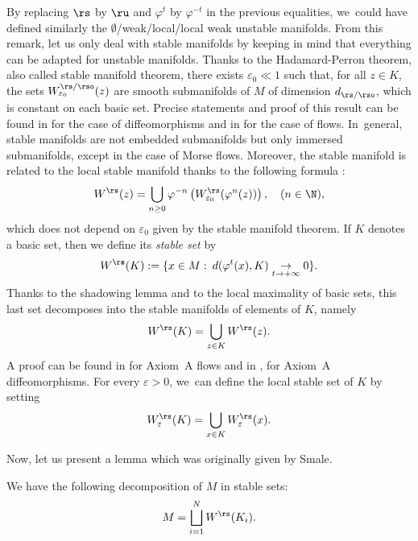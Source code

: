 By replacing $\rs$ by $\ru$ and $\varphi^t$ by $\varphi^{-t}$ in the previous equalities, we~could have defined similarly the $\emptyset$/weak/local/local weak unstable manifolds. From this remark, let us only deal with stable manifolds by keeping in mind that everything can be adapted for unstable manifolds. Thanks to the Hadamard-Perron theorem, also called stable manifold theorem, there exists $\varepsilon_0 \ll 1$ such that, for all $z \in K$, the sets $W_{\varepsilon_0}^{\rs/\rso} (z)$ are smooth submanifolds of $M$ of dimension $d_{\rs/\rso}$, which is constant on each basic set. Precise statements and proof of this result can be found in \cite[Th.\,6.4.9, p.\,267]{katok-hasselblatt} for the case of diffeomorphisms and in \cite[Th.\,5, p.\,34]{dyatlov} for the case of flows. In~general, stable manifolds are not embedded submanifolds but only immersed submanifolds, except in the case of Morse flows. Moreover, the stable manifold is related to the local stable manifold thanks to the following formula \cite[p.\,24]{dyatlov}:
\[
W^\rs (z) = \bigcup_{n \geq 0} \varphi^{-n} \left(W_{\varepsilon_0}^\rs (\varphi^{n} (z)) \right), \quad (n \in \N),
\]
which does not depend on $\varepsilon_0$ given by the stable manifold theorem. If $K$ denotes a basic set, then we define its \textit{stable set} by
\[
W^{\rs} (K):= \{ x \in M: \: d(\varphi^{ t} (x), K) \underset{t \to +\infty}{\to} 0 \}.
\]
Thanks to the shadowing lemma \cite[Th.\,18.1.6 p.\,569]{katok-hasselblatt} and to the local maximality of basic sets, this last set decomposes into the stable manifolds of elements of $K$, namely
\[
W^\rs (K) = \bigcup_{z \in K} W^\rs (z).
\]
A proof can be found in \cite[Th.\,5.3.25]{FH} for Axiom~A flows and in \cite[Prop.\,3.10, p.\,53]{bowen3}, \cite[Th.\,6.26, p.\,131]{wen} for Axiom~A diffeomorphisms. For every $\varepsilon >0$, we~can define the local stable set of $K$ by setting
\begin{equation}\label{eq: local decomposition of the stable manifold of a basic set}
W_{\varepsilon}^\rs (K) = \bigcup_{x \in K} W_{\varepsilon}^\rs (x).
\end{equation}

Now, let us present a lemma which was originally given by Smale.

\begin{lemma}\label{lemma: spectral decomposition of the manifold} We have the following decomposition of $M$ in stable sets:
\begin{equation} \label{partition of the manifold in stable manifolds}
M = \bigsqcup_{i = 1}^N W^\rs (K_i).
\end{equation}
\end{lemma}

